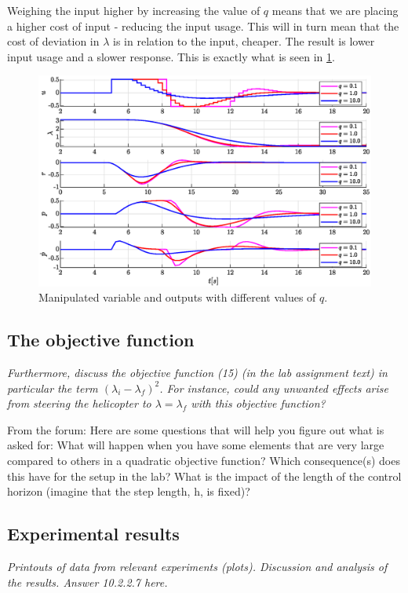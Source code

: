 \documentclass[../main.tex]{subfiles}
\begin{document}
Weighing the input higher by increasing the value of $q$ means that we are placing a higher cost of input - reducing the input usage. This will in turn mean that the cost of deviation in $\lambda$ is in relation to the input, cheaper. The result is lower input usage and a slower response. This is exactly what is seen in \cref{fig:lab2optimalu}.

\begin{figure}[h]
	\centering
	\includegraphics[width=\linewidth]{figures/lab2_optimal_u}
	\caption{Manipulated variable and outputs with different values of $q$.}
	\label{fig:lab2optimalu}
\end{figure}

\subsection{The objective function}
\textit{Furthermore, discuss the objective function (15) (in the lab assignment text) in particular the term $(\lambda_i-\lambda_f )^2$. For instance, could any unwanted effects arise from steering the helicopter to $\lambda =\lambda_f$ with this objective function?}

From the forum: Here are some questions that will help you figure out what is asked for:
What will happen when you have some elements that are very large compared to others in a quadratic objective function? Which consequence(s) does this have for the setup in the lab? What is the impact of the length of the control horizon (imagine that the step length, h, is fixed)?

\clearpage
\subsection{Experimental results}
\textit{Printouts of data from relevant experiments (plots).
Discussion and analysis of the results.
Answer 10.2.2.7 here.}
\end{document}
